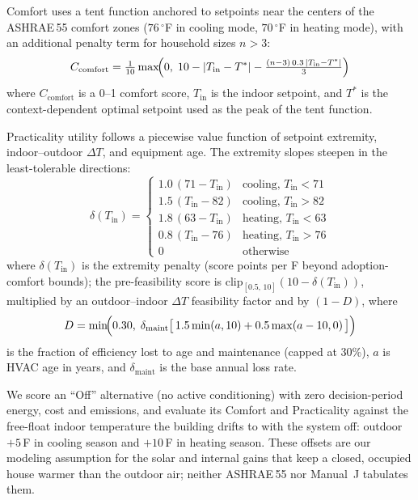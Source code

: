 \documentclass[final,3p,times]{elsarticle}
\begin{document}
Comfort uses a tent function anchored to setpoints near the centers of the ASHRAE\,55 comfort zones \cite{ashrae55_2020} ($76\,^\circ$F in cooling mode, $70\,^\circ$F in heating mode), with an additional penalty term for household sizes $n > 3$:
\begin{equation}
  C_{\mathrm{comfort}} = \tfrac{1}{10}\max\!\Bigl(0,\; 10 - \lvert T_{\mathrm{in}} - T^{*}\rvert - \tfrac{(n-3)\,0.3\,\lvert T_{\mathrm{in}} - T^{*}\rvert}{3}\Bigr)
  \label{eq:hvac_comfort}
\end{equation}
\noindent where $C_{\mathrm{comfort}}$ is a 0--1 comfort score, $T_{\mathrm{in}}$ is the indoor setpoint, and $T^{*}$ is the context-dependent optimal setpoint used as the peak of the tent function.

Practicality utility follows a piecewise value function of setpoint extremity, indoor--outdoor $\Delta T$, and equipment age. The extremity slopes steepen in the least-tolerable directions:
\begin{equation}
  \delta(T_{\mathrm{in}}) =
  \begin{cases}
    1.0\,(71 - T_{\mathrm{in}}) & \text{cooling, } T_{\mathrm{in}} < 71 \\[3pt]
    1.5\,(T_{\mathrm{in}} - 82) & \text{cooling, } T_{\mathrm{in}} > 82 \\[3pt]
    1.8\,(63 - T_{\mathrm{in}}) & \text{heating, } T_{\mathrm{in}} < 63 \\[3pt]
    0.8\,(T_{\mathrm{in}} - 76) & \text{heating, } T_{\mathrm{in}} > 76 \\[3pt]
    0                             & \text{otherwise}
  \end{cases}
  \label{eq:hvac_practicality}
\end{equation}
\noindent where $\delta(T_{\mathrm{in}})$ is the extremity penalty (score points per \textdegree{}F beyond adoption-comfort bounds); the pre-feasibility score is $\mathrm{clip}_{[0.5,\,10]}(10-\delta(T_{\mathrm{in}}))$, multiplied by an outdoor--indoor $\Delta T$ feasibility factor and by $(1-D)$, where
\begin{equation}
  D = \min\!\Bigl(0.30,\; \delta_{\mathrm{maint}}\bigl[\,1.5\min(a,10) + 0.5\max(a-10,0)\,\bigr]\Bigr)
  \label{eq:hvac_degradation}
\end{equation}
\noindent is the fraction of efficiency lost to age and maintenance (capped at 30\%), $a$ is HVAC age in years, and $\delta_{\mathrm{maint}}$ is the base annual loss rate.

We score an ``Off'' alternative (no active conditioning) with zero decision-period energy, cost and emissions, and evaluate its Comfort and Practicality against the free-float indoor temperature the building drifts to with the system off: outdoor $+5$\,\textdegree{}F in cooling season and $+10$\,\textdegree{}F in heating season. These offsets are our modeling assumption for the solar and internal gains that keep a closed, occupied house warmer than the outdoor air; neither ASHRAE\,55 \cite{ashrae55_2020} nor Manual~J \cite{accamanualj} tabulates them.
\end{document}
